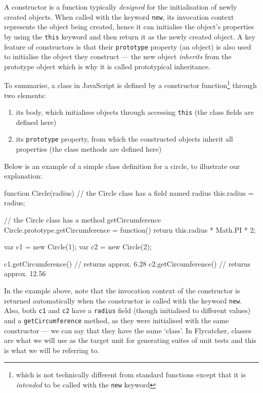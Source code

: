 A constructor is a function typically \emph{designed} for the initialisation of newly created objects. When called with the keyword \texttt{new}, its invocation context represents the object being created, hence it can initialise the object's properties by using the \texttt{this} keyword and then return it as the newly created object. A key feature of constructors is that their \texttt{prototype} property (an object) is also used to initialise the object they construct --- the new object \emph{inherits} from the prototype object which is why it is called prototypical inheritance.

To summarise, a class in JavaScript is defined by a constructor function\footnote{which is not technically different from standard functions except that it is \emph{intended} to be called with the \texttt{new} keyword} through two elements:

\begin{enumerate}
   \item its body, which initialises objects through accessing \texttt{this} (the class fields are defined here)
   \item its \texttt{prototype} property, from which the constructed objects inherit all properties (the class methods are defined here)
\end{enumerate}

Below is an example of a simple class definition for a circle, to illustrate our explanation:

\begin{code}[caption=JavaScript class definition,label=jsclassdef]
function Circle(radius) {
    // the Circle class has a field named radius
    this.radius = radius;
}

// the Circle class has a method getCircumference
Circle.prototype.getCircumference = function() {
    return this.radius * Math.PI * 2;
}

var c1 = new Circle(1);
var c2 = new Circle(2);

c1.getCircumference() // returns approx. 6.28
c2.getCircumference() // returns approx. 12.56

\end{code}

In the example above, note that the invocation context of the constructor is returned automatically when the constructor is called with the keyword \texttt{new}. Also, both \texttt{c1} and \texttt{c2} have a \texttt{radius} field (though initialised to different values) and a \texttt{getCircumference} method, as they were initialised with the same constructor --- we can say that they have the same `class'. In \textsf{Flycatcher}, classes are what we will use as the target unit for generating suites of unit tests and this is what we will be referring to.

